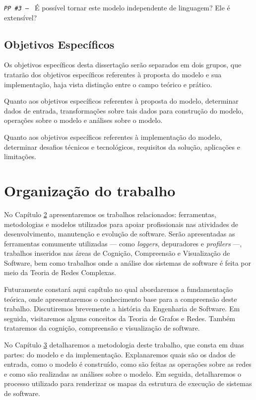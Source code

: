 \noindent
\texttt{\textit{PP \#3 -- }}
É possível tornar este modelo independente de linguagem? Ele é extensível?

\subsection{Objetivos Específicos}
\label{subsec:ObjetivosEspecíficos}

Os objetivos específicos desta dissertação serão separados em dois grupos, que
tratarão dos objetivos específicos referentes à proposta do modelo e sua
implementação, haja vista distinção entre o campo teórico e prático.

Quanto aos objetivos específicos referentes à proposta do modelo, determinar
dados de entrada, transformações sobre tais dados para construção do modelo,
operações sobre o modelo e análises sobre o modelo.

Quanto aos objetivos específicos referentes à implementação do modelo,
determinar desafios técnicos e tecnológicos, requisitos da solução, aplicações e
limitações.

\section{Organização do trabalho}
\label{sec:OrganizaçãoTrabalho}

No Capítulo \hyperref[Chapter:RelatedWork]{2} apresentaremos os trabalhos
relacionados: ferramentas, metodologias e modelos utilizados para apoiar
profissionais nas atividades de  desenvolvimento, manutenção e evolução de
software.
Serão apresentadas as ferramentas comumente utilizadas --- como
\textit{loggers}, depuradores e \textit{profilers} ---, trabalhos inseridos nas
áreas de Cognição, Compreensão e Visualização de Software, bem como trabalhos
onde a análise dos sistemas de software é feita por meio da Teoria de Redes
Complexas.

Futuramente constará aqui capítulo no qual abordaremos a fundamentação teórica,
onde apresentaremos o conhecimento base para a compreensão deste trabalho.
Discutiremos brevemente a história da Engenharia de Software.
Em seguida, visitaremos alguns conceitos da Teoria de Grafos e Redes.
Também trataremos da cognição, compreensão e visualização de software.

No Capítulo \hyperref[Chapter:Methodoly]{3} detalharemos a metodologia deste
trabalho, que consta em duas partes: do modelo e da implementação.
Explanaremos quais são os dados de entrada, como o modelo é construído, como são
feitas as operações sobre as redes e como são realizadas as análises sobre o
modelo. Em seguida, detalharemos o processo utilizado para renderizar os mapas
da estrutura de execução de sistemas de software.


